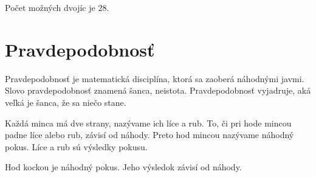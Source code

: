 \documentclass{article}
\begin{document}
\noindent
Počet možných dvojíc je \(28\).

\section{Pravdepodobnosť}

Pravdepodobnosť je matematická disciplína, ktorá sa zaoberá náhodnými javmi. Slovo pravdepodobnosť znamená šanca, neistota. Pravdepodobnosť vyjadruje, aká veľká je šanca, že sa niečo stane.

Každá minca má dve strany, nazývame ich líce a rub. To, či pri hode mincou padne líce alebo rub, závisí od náhody. Preto hod mincou nazývame náhodný pokus. Líce a rub sú výsledky pokusu.

Hod kockou je náhodný pokus. Jeho výsledok závisí od náhody.
\end{document}
